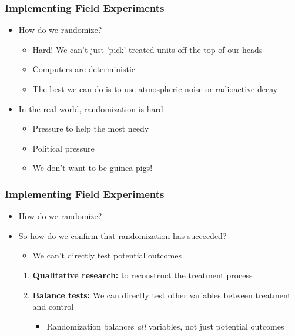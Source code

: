 \documentclass[xcolor=x11names,compress]{beamer}\usepackage[]{graphicx}\usepackage[]{color}
\renewcommand{\(}{\begin{columns}}
\renewcommand{\)}{\end{columns}}
\newcommand{\<}[1]{\begin{column}{#1}}
\renewcommand{\>}{\end{column}}
\begin{document}
\begin{frame}
\frametitle{Implementing Field Experiments}
\begin{itemize}
\item How do we randomize?
\begin{itemize}
\item Hard! We can't just 'pick' treated units off the top of our heads
\pause
\item Computers are deterministic
\pause
\item The best we can do is to use atmospheric noise or radioactive decay
\pause
\end{itemize}
\item In the real world, randomization is hard
\begin{itemize}
\item Pressure to help the most needy
\pause
\item Political pressure
\pause
\item We don't want to be guinea pigs!
\end{itemize}
\end{itemize}
\end{frame}

\begin{frame}
\frametitle{Implementing Field Experiments}
\begin{itemize}
\item How do we randomize?
\pause
\item So how do we confirm that randomization has succeeded?
\pause
\begin{itemize}
\item We can't directly test potential outcomes
\end{itemize}
\begin{enumerate}
\item \textbf{Qualitative research:} to reconstruct the treatment process
\pause
\item \textbf{Balance tests:} We can directly test other variables between treatment and control
\begin{itemize}
\item Randomization balances \textit{all} variables, not just potential outcomes
\end{itemize}
\end{enumerate}
\end{itemize}
\end{frame}
\end{document}
